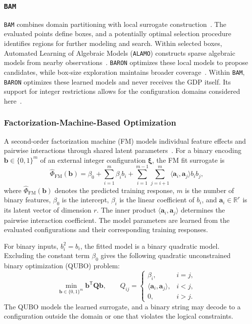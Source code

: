 \documentclass{article}
\begin{document}
\subsubsection{\texttt{BAM}}
\texttt{BAM} combines domain partitioning with local surrogate construction~\citep{ma2023bam}.
The evaluated points define boxes, and a potentially optimal selection procedure identifies regions for further modeling and search.
Within selected boxes, Automated Learning of Algebraic Models (\texttt{ALAMO}) constructs sparse algebraic models from nearby observations~\citep{cozad2014learning}.
\texttt{BARON} optimizes these local models to propose candidates, while box-size exploration maintains broader coverage~\citep{ma2023bam,bamManual,sahinidis1996baron}.
Within \texttt{BAM}, \texttt{BARON} optimizes these learned models and never receives the GDP itself.
Its support for integer restrictions allows for the configuration domains considered here~\citep{bamManual}.

\subsubsection{Factorization-Machine-Based Optimization}

A second-order factorization machine (FM) models individual feature effects and pairwise interactions through shared latent parameters~\citep{rendle2010factorization}.
For a binary encoding \(\mathbf b\in\{0,1\}^{m}\) of an external integer configuration \(\boldsymbol\xi\), the FM fit surrogate is
\begin{equation}\label{eqn:fm.surrogate}
\widehat\Phi_{\mathrm{FM}}(\mathbf b)
=\beta_0+\sum_{i=1}^{m}\beta_i b_i
+\sum_{i=1}^{m-1}\sum_{j=i+1}^{m}
\langle\mathbf a_i,\mathbf a_j\rangle b_i b_j,
\end{equation}
where \(\widehat\Phi_{\mathrm{FM}}(\mathbf b)\) denotes the predicted training response, \(m\) is the number of binary features, \(\beta_0\) is the intercept, \(\beta_i\) is the linear coefficient of \(b_i\), and \(\mathbf a_i\in\mathbb R^r\) is its latent vector of dimension \(r\).
The inner product \(\langle\mathbf a_i,\mathbf a_j\rangle\) determines the pairwise interaction coefficient.
The model parameters are learned from the evaluated configurations and their corresponding training responses.

For binary inputs, \(b_i^2=b_i\), the fitted model is a binary quadratic model.
Excluding the constant term \(\beta_0\) gives the following quadratic unconstrained binary optimization (QUBO) problem:
\begin{equation}\label{eqn:fm.qubo}
\min_{\mathbf b\in\{0,1\}^{m}}\mathbf b^{\mathsf T}\mathbf Q\mathbf b,
\qquad
Q_{ij}=\begin{cases}
\beta_i,&i=j,\\
\langle\mathbf a_i,\mathbf a_j\rangle,&i<j,\\
0,&i>j.
\end{cases}
\end{equation}
The QUBO models the learned surrogate, and a binary string may decode to a configuration outside the domain or one that violates the logical constraints.
\end{document}
